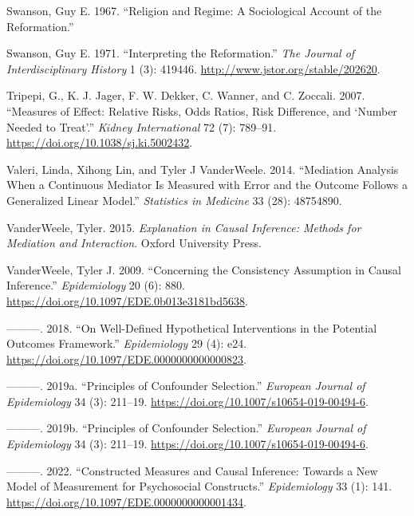 \documentclass[
  singlecolumn]{report}
\newlength{\cslhangindent}
\newlength{\cslentryspacingunit} %
\newenvironment{CSLReferences}[2] %
 {%
  \setlength{\parindent}{0pt}
  \ifodd #1
  \let\oldpar\par
  \def\par{\hangindent=\cslhangindent\oldpar}
  \fi
  \setlength{\parskip}{#2\cslentryspacingunit}
 }%
 {}
\begin{document}
\begin{CSLReferences}{1}{0}
\leavevmode{}%
Swanson, Guy E. 1967. {``Religion and Regime: A Sociological Account of
the Reformation.''}

\leavevmode{}%
Swanson, Guy E. 1971. {``Interpreting the Reformation.''} \emph{The
Journal of Interdisciplinary History} 1 (3): 419446.
\url{http://www.jstor.org/stable/202620}.

\leavevmode{}%
Tripepi, G., K. J. Jager, F. W. Dekker, C. Wanner, and C. Zoccali. 2007.
{``Measures of Effect: Relative Risks, Odds Ratios, Risk Difference, and
{`}Number Needed to Treat{'}.''} \emph{Kidney International} 72 (7):
789--91. \url{https://doi.org/10.1038/sj.ki.5002432}.

\leavevmode{}%
Valeri, Linda, Xihong Lin, and Tyler J VanderWeele. 2014. {``Mediation
Analysis When a Continuous Mediator Is Measured with Error and the
Outcome Follows a Generalized Linear Model.''} \emph{Statistics in
Medicine} 33 (28): 48754890.

\leavevmode{}%
VanderWeele, Tyler. 2015. \emph{Explanation in Causal Inference: Methods
for Mediation and Interaction}. Oxford University Press.

\leavevmode{}%
VanderWeele, Tyler J. 2009. {``Concerning the Consistency Assumption in
Causal Inference.''} \emph{Epidemiology} 20 (6): 880.
\url{https://doi.org/10.1097/EDE.0b013e3181bd5638}.

\leavevmode{}%
---------. 2018. {``On Well-Defined Hypothetical Interventions in the
Potential Outcomes Framework.''} \emph{Epidemiology} 29 (4): e24.
\url{https://doi.org/10.1097/EDE.0000000000000823}.

\leavevmode{}%
---------. 2019a. {``Principles of Confounder Selection.''}
\emph{European Journal of Epidemiology} 34 (3): 211--19.
\url{https://doi.org/10.1007/s10654-019-00494-6}.

\leavevmode{}%
---------. 2019b. {``Principles of Confounder Selection.''}
\emph{European Journal of Epidemiology} 34 (3): 211--19.
\url{https://doi.org/10.1007/s10654-019-00494-6}.

\leavevmode{}%
---------. 2022. {``Constructed Measures and Causal Inference: Towards a
New Model of Measurement for Psychosocial Constructs.''}
\emph{Epidemiology} 33 (1): 141.
\url{https://doi.org/10.1097/EDE.0000000000001434}.


\end{CSLReferences}
\end{document}
